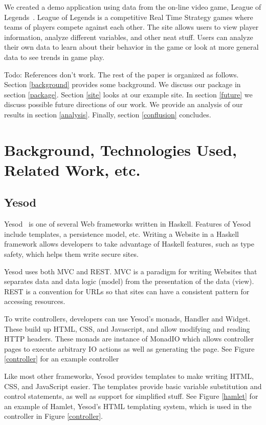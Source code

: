 \documentclass[letterpaper,twocolumn,9pt]{article}
\begin{document}
We created  a demo application using data from the on-line video game, League of Legends~\cite{lol}. League of Legends is a competitive Real Time Strategy games where teams of players compete against each other. The site allows users to view player information, analyze different variables, and other neat stuff. Users can analyze their own data to learn about their behavior in the game or look at more general data to see trends in game play.

Todo: References don't work.
The rest of the paper is organized as follows. Section \ref{background} provides some background. We discuss our package in section \ref{package}. Section \ref{site} looks at our example site. In section \ref{future} we discuss possible future directions of our work. We provide an analysis of our results in section \ref{analysis}. Finally, section \ref{conflusion} concludes.

\section{Background, Technologies Used, Related Work, etc.}
\label{sec:background}

\subsection{Yesod}

Yesod~\cite{yesod} is one of several Web frameworks written in Haskell. Features of Yesod include templates, a persistence model, etc. Writing a Website in a Haskell framework allows developers to take advantage of Haskell features, such as type safety, which helps them write secure sites.

Yesod uses both MVC and REST. MVC is a paradigm for writing Websites that separates data and data logic (model) from the presentation of the data (view). REST is a convention for URLs so that sites can have a consistent pattern for accessing resources.

To write controllers, developers can use Yesod's monads, Handler and Widget. These build up HTML, CSS, and Javascript, and allow modifying and reading HTTP headers. These monads are instance of MonadIO which allows controller pages to execute arbitrary IO actions as well as generating the page. See Figure \ref{controller} for an example controller

Like most other frameworks, Yesod provides templates to make writing HTML, CSS, and JavaScript easier. The templates provide basic variable substitution and control statements, as well as support for simplified stuff. See Figure \ref{hamlet} for an example of Hamlet, Yesod's HTML templating system, which is used in the controller in Figure \ref{controller}.
\end{document}
